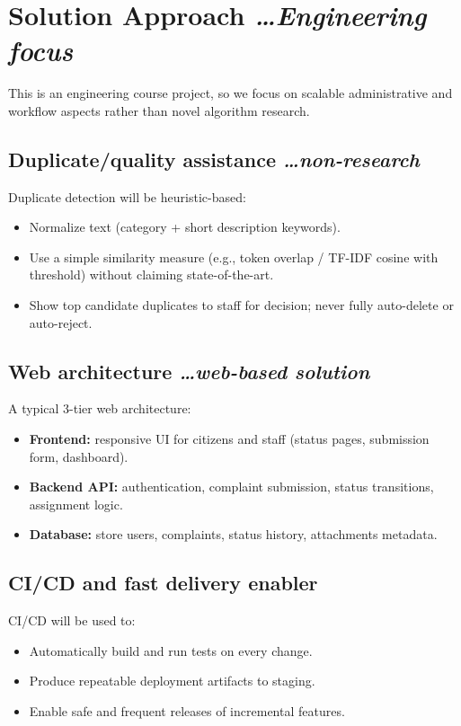 \documentclass[11pt,a4paper]{article}
\newcommand{\BvrHint}[1]{%
  {\normalfont\normalsize\itshape\hfill #1}}
\begin{document}
\section{Solution Approach %
\BvrHint{\ldots Engineering focus}}
This is an engineering course project, so we focus on scalable administrative and workflow aspects rather than novel algorithm research.

\subsection{Duplicate/quality assistance %
\BvrHint{\ldots non-research}}
Duplicate detection will be heuristic-based:
\begin{itemize}[leftmargin=0.7cm]
    \item Normalize text (category + short description keywords).
    \item Use a simple similarity measure (e.g., token overlap / TF-IDF cosine with threshold) without claiming state-of-the-art.
    \item Show top candidate duplicates to staff for decision; never fully auto-delete or auto-reject.
\end{itemize}

\subsection{Web architecture %
\BvrHint{\ldots web-based solution}}
A typical 3-tier web architecture:
\begin{itemize}[leftmargin=0.7cm]
    \item \textbf{Frontend:} responsive UI for citizens and staff (status pages, submission form, dashboard).
    \item \textbf{Backend API:} authentication, complaint submission, status transitions, assignment logic.
    \item \textbf{Database:} store users, complaints, status history, attachments metadata.
\end{itemize}

\subsection{CI/CD and fast delivery enabler}
CI/CD will be used to:
\begin{itemize}[leftmargin=0.7cm]
    \item Automatically build and run tests on every change.
    \item Produce repeatable deployment artifacts to staging.
    \item Enable safe and frequent releases of incremental features.
\end{itemize}
\end{document}
